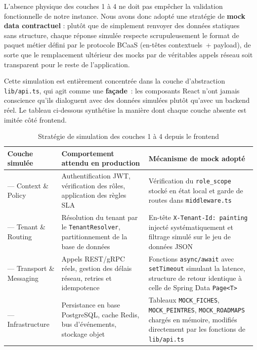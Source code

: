 \documentclass[12pt,a4paper]{report}
\begin{document}
L'absence physique des couches 1 à 4 ne doit pas empêcher la validation fonctionnelle de notre instance. Nous avons donc adopté une stratégie de \textbf{mock data contractuel} : plutôt que de simplement renvoyer des données statiques sans structure, chaque réponse simulée respecte scrupuleusement le format de paquet métier défini par le protocole BCaaS (en-têtes contextuels~+ payload), de sorte que le remplacement ultérieur des mocks par de véritables appels réseau soit transparent pour le reste de l'application.

Cette simulation est entièrement concentrée dans la couche d'abstraction \texttt{lib/api.ts}, qui agit comme une \textbf{façade}~: les composants React n'ont jamais conscience qu'ils dialoguent avec des données simulées plutôt qu'avec un backend réel. Le tableau ci-dessous synthétise la manière dont chaque couche absente est imitée côté frontend.

\begin{table}[H]
\centering
\renewcommand{\arraystretch}{1.4}
\small
\begin{tabularx}{\textwidth}{>{\centering\arraybackslash}p{} >{\raggedright\arraybackslash}X >{\raggedright\arraybackslash}X}
\toprule
\textbf{Couche simulée} & \textbf{Comportement attendu en production} & \textbf{Mécanisme de mock adopté} \\
\midrule
4 --- Context \& Policy & Authentification JWT, vérification des rôles, application des règles SLA & Vérification du \texttt{role\_scope} stocké en état local et garde de routes dans \texttt{middleware.ts} \\
3 --- Tenant \& Routing & Résolution du tenant par le \texttt{TenantResolver}, partitionnement de la base de données & En-tête \texttt{X-Tenant-Id: painting} injecté systématiquement et filtrage simulé sur le jeu de données JSON \\
2 --- Transport \& Messaging & Appels REST/gRPC réels, gestion des délais réseau, retries et idempotence & Fonctions \texttt{async/await} avec \texttt{setTimeout} simulant la latence, structure de retour identique à celle de Spring Data \texttt{Page<T>} \\
1 --- Infrastructure & Persistance en base PostgreSQL, cache Redis, bus d'événements, stockage objet & Tableaux \texttt{MOCK\_FICHES}, \texttt{MOCK\_PEINTRES}, \texttt{MOCK\_ROADMAPS} chargés en mémoire, modifiés directement par les fonctions de \texttt{lib/api.ts} \\
\bottomrule
\end{tabularx}
\caption{Stratégie de simulation des couches 1 à 4 depuis le frontend}
\label{tab:simulation_couches}
\end{table}
\end{document}

